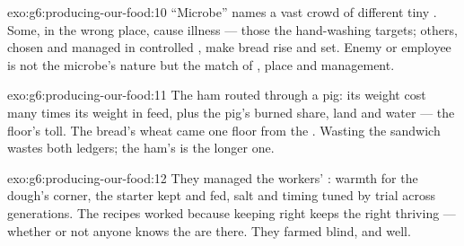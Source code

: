\begin{solution}{exo:g6:producing-our-food:10}
``Microbe'' names a vast crowd of different tiny . Some, in the wrong place, cause illness --- those
the hand-washing targets; others, chosen and managed in
controlled , make bread rise and  set. Enemy
or employee is not the microbe's nature but the match of
, place and management.
\end{solution}

\begin{solution}{exo:g6:producing-our-food:11}
The ham routed through a pig: its weight cost many times
its weight in feed, plus the pig's burned share, land and
water --- the  floor's toll. The bread's wheat came
one floor from the . Wasting the sandwich wastes both
ledgers; the ham's is the longer one.
\end{solution}

\begin{solution}{exo:g6:producing-our-food:12}
They managed the workers' \emph{}: warmth for
the dough's corner, the starter kept and fed, salt and
timing tuned by trial across generations. The recipes
worked because keeping  right keeps the right
 thriving --- whether or not anyone knows the
 are there. They farmed  blind, and
well.
\end{solution}

